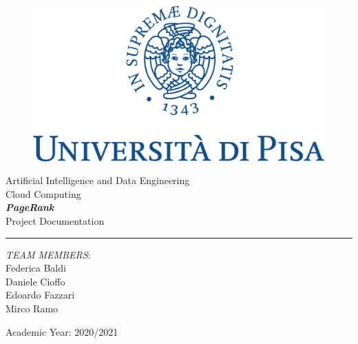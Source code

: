 \documentclass[11pt]{article}
\begin{document}
\begin{titlepage}
    \begin{center}
        \begin{figure}
            \includegraphics[width=\textwidth]{img/marchio_unipi_pant541-eps-converted-to.pdf}         
        \end{figure}
        {\Large
        Artificial Intelligence and Data Engineering\\
        \vspace{5mm} %
        Cloud Computing}\\
        \vspace{30mm} %
        {\Huge\textbf{\textit{PageRank}}}\\
        \vspace{10mm} %
        {\Large Project Documentation}\\
        \par\noindent\rule{\textwidth}{0.4pt}
            \begin{flushright}
                \textit{TEAM MEMBERS}:\\
                Federica Baldi\\
                Daniele Cioffo\\
                Edoardo Fazzari\\ 
                Mirco Ramo\\
        	
            \end{flushright}
            \vfill
        Academic Year: 2020/2021\\        
    \end{center}
\end{titlepage} 
   
\tableofcontents




\end{document}
